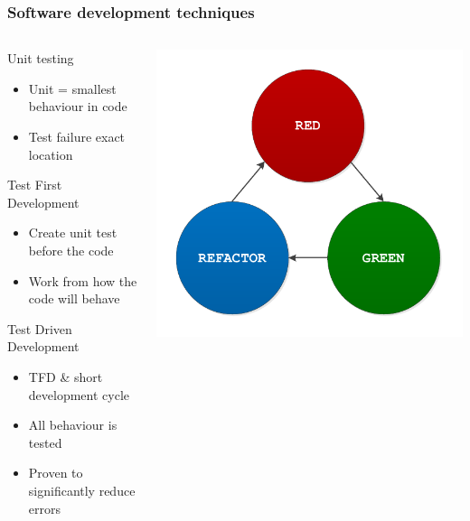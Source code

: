 \documentclass[british,10pt]{beamer}
\begin{document}
\begin{frame}\frametitle{Software development techniques}
\begin{columns}
\begin{column}{0.6\textwidth}
Unit testing
\begin{itemize}
\item Unit = smallest behaviour in code
\item Test failure  exact location
\end{itemize}
\vskip3pt
Test First Development
\begin{itemize}
\item Create unit test before the code
\item Work from how the code will behave
\end{itemize}
\vskip3pt
Test Driven Development
\begin{itemize}
\item TFD \& short development cycle
\item All behaviour is tested
\item Proven to significantly reduce errors
\end{itemize}
\end{column}
\includegraphics[width=\textwidth]{images/tdd.pdf}
\end{columns}
\end{frame}
\end{document}
